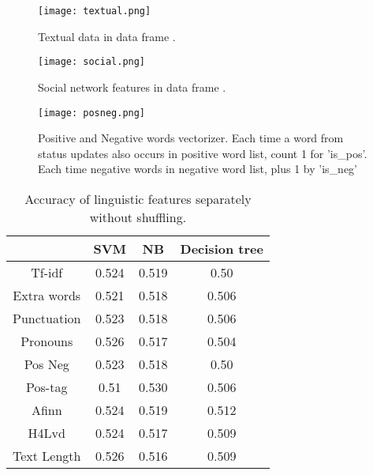 \documentclass[
10pt, %
a4paper, %
oneside, %
headinclude,footinclude, %
] {book}%
\begin{document}
\begin{figure}[!htb]
    \centering 
    \caption{Textual data in data frame .\label{fig:data_text}}
    \texttt{[image: textual.png]}
\end{figure}

\begin{figure}[!htb]
    \centering 
    \caption{Social network features in data frame .\label{fig:data_social}}
    \texttt{[image: social.png]}
\end{figure}

\begin{figure}[!htb]
    \centering 
    \caption{Positive and Negative words vectorizer. Each time a word from status updates also occurs in positive word list, count 1 for 'is\_pos'. Each time negative words in negative word list, plus 1 by 'is\_neg'}
    \label{fig:posneg}
    \texttt{[image: posneg.png]}
\end{figure}

\begin{table}[hbtp]\centering
\caption{Accuracy of linguistic features separately without shuffling.\label{table:lingno}}
\begin{tabular}{|cccc|}
\hline
 & SVM & NB & Decision tree\\
\hline
Tf-idf & 0.524 & 0.519 & 0.50\\
Extra words & 0.521 & 0.518 & 0.506\\
Punctuation & 0.523 & 0.518 & 0.506\\
Pronouns & 0.526 & 0.517 & 0.504\\
Pos Neg & 0.523 & 0.518 & 0.50\\
Pos-tag & 0.51 & 0.530 & 0.506\\
Afinn & 0.524 & 0.519 & 0.512\\
H4Lvd & 0.524 & 0.517 & 0.509\\
Text Length & 0.526 & 0.516 & 0.509\\
\hline
\end{tabular}
\end{table}
\end{document}
